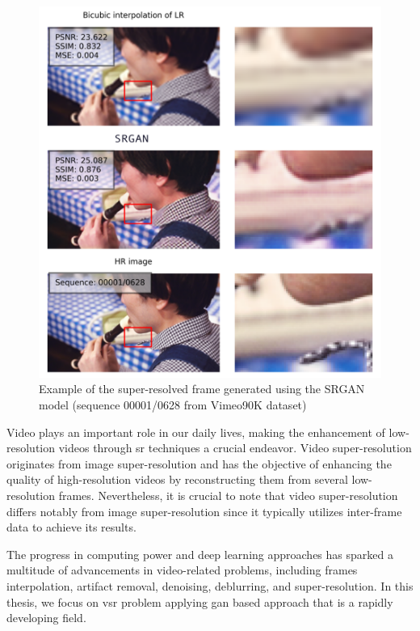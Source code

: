 \documentclass[conference]{IEEEtran}
\begin{document}
\begin{figure}[b]
	\centering
	\includegraphics[scale=1.5]{results/crop_00001_0628}
	\caption{Example of the super-resolved frame generated using the SRGAN model (sequence 00001/0628 from Vimeo90K dataset)}
	\label{fig:example_sr_conclusion}
\end{figure}

Video plays an important role in our daily lives, making the enhancement of low-resolution videos through \acrshort{sr} techniques a crucial endeavor. Video super-resolution originates from image super-resolution and has the objective of enhancing the quality of high-resolution videos by reconstructing them from several low-resolution frames. Nevertheless, it is crucial to note that video super-resolution differs notably from image super-resolution since it typically utilizes inter-frame data to achieve its results.

The progress in computing power and deep learning approaches has sparked a multitude of advancements in video-related problems, including frames interpolation, artifact removal, denoising, deblurring, and super-resolution. In this thesis, we focus on \acrshort{vsr} problem applying \acrshort{gan} based approach that is a rapidly developing field.
\end{document}
